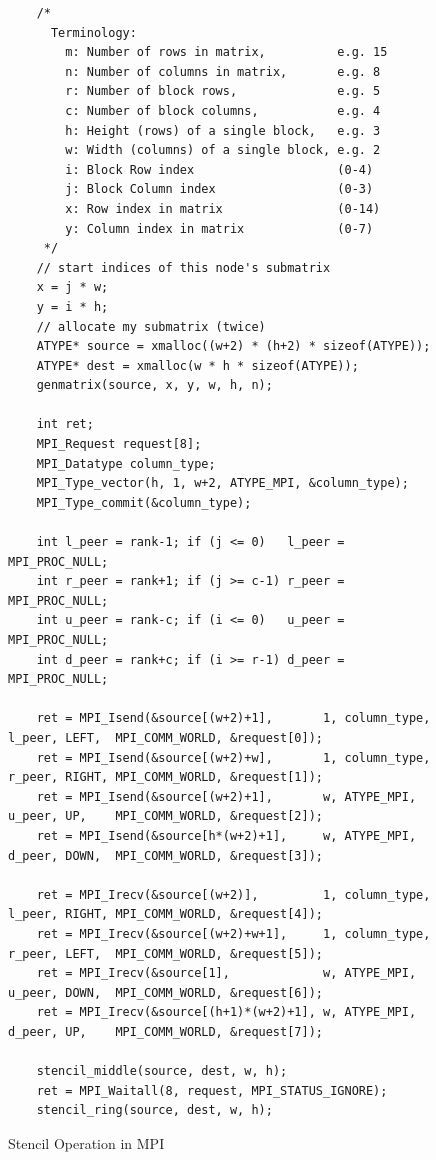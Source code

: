 \documentclass[12pt]{article}
\begin{document}
\begin{figure}[H]
\caption{Stencil Operation in MPI}
\begin{lstlisting}
	/*
	  Terminology:
		m: Number of rows in matrix,          e.g. 15
		n: Number of columns in matrix,       e.g. 8
		r: Number of block rows,              e.g. 5
		c: Number of block columns,           e.g. 4
		h: Height (rows) of a single block,   e.g. 3
		w: Width (columns) of a single block, e.g. 2
		i: Block Row index                    (0-4)
		j: Block Column index                 (0-3)
		x: Row index in matrix                (0-14)
		y: Column index in matrix             (0-7)
	 */
	// start indices of this node's submatrix
	x = j * w;
	y = i * h;
	// allocate my submatrix (twice)
	ATYPE* source = xmalloc((w+2) * (h+2) * sizeof(ATYPE));
	ATYPE* dest = xmalloc(w * h * sizeof(ATYPE));
	genmatrix(source, x, y, w, h, n);

	int ret;
	MPI_Request request[8];
	MPI_Datatype column_type;
	MPI_Type_vector(h, 1, w+2, ATYPE_MPI, &column_type);
	MPI_Type_commit(&column_type);

	int l_peer = rank-1; if (j <= 0)   l_peer = MPI_PROC_NULL;
	int r_peer = rank+1; if (j >= c-1) r_peer = MPI_PROC_NULL;
	int u_peer = rank-c; if (i <= 0)   u_peer = MPI_PROC_NULL;
	int d_peer = rank+c; if (i >= r-1) d_peer = MPI_PROC_NULL;

	ret = MPI_Isend(&source[(w+2)+1],       1, column_type, l_peer, LEFT,  MPI_COMM_WORLD, &request[0]);
	ret = MPI_Isend(&source[(w+2)+w],       1, column_type, r_peer, RIGHT, MPI_COMM_WORLD, &request[1]);
	ret = MPI_Isend(&source[(w+2)+1],       w, ATYPE_MPI,   u_peer, UP,    MPI_COMM_WORLD, &request[2]);
	ret = MPI_Isend(&source[h*(w+2)+1],     w, ATYPE_MPI,   d_peer, DOWN,  MPI_COMM_WORLD, &request[3]);

	ret = MPI_Irecv(&source[(w+2)],         1, column_type, l_peer, RIGHT, MPI_COMM_WORLD, &request[4]);
	ret = MPI_Irecv(&source[(w+2)+w+1],     1, column_type, r_peer, LEFT,  MPI_COMM_WORLD, &request[5]);
	ret = MPI_Irecv(&source[1],             w, ATYPE_MPI,   u_peer, DOWN,  MPI_COMM_WORLD, &request[6]);
	ret = MPI_Irecv(&source[(h+1)*(w+2)+1], w, ATYPE_MPI,   d_peer, UP,    MPI_COMM_WORLD, &request[7]);

	stencil_middle(source, dest, w, h);
	ret = MPI_Waitall(8, request, MPI_STATUS_IGNORE);
	stencil_ring(source, dest, w, h);

\end{lstlisting}
\label{mpi_stencil_code}
\end{figure}
\end{document}
